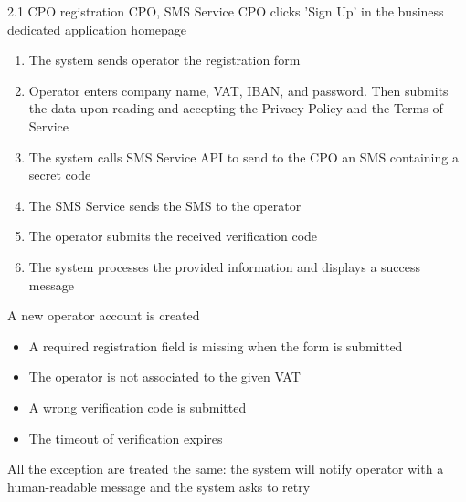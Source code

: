 \usecase
{
}
{2.1}
{CPO registration} %
{CPO, SMS Service} %
{CPO clicks 'Sign Up' in the business dedicated application homepage} %
{ %
    \begin{enumerate}
        \item The system sends operator the registration form
        \item Operator enters company name, VAT, IBAN, and password. Then submits the data upon reading and accepting the Privacy Policy and the Terms of Service
        \item The system calls SMS Service API to send to the CPO an SMS containing a secret code
        \item The SMS Service sends the SMS to the operator
        \item The operator submits the received verification code
        \item The system processes the provided information and displays a success message
    \end{enumerate}
}
{A new operator account is created} %
{ %
    \begin{itemize}
        \item A required registration field is missing when the form is submitted
        \item The operator is not associated to the given VAT
        \item A wrong verification code is submitted
        \item The timeout of verification expires
    \end{itemize}
}
{ %
    All the exception are treated the same: the system will notify operator with a human-readable message and the system asks to retry
}

